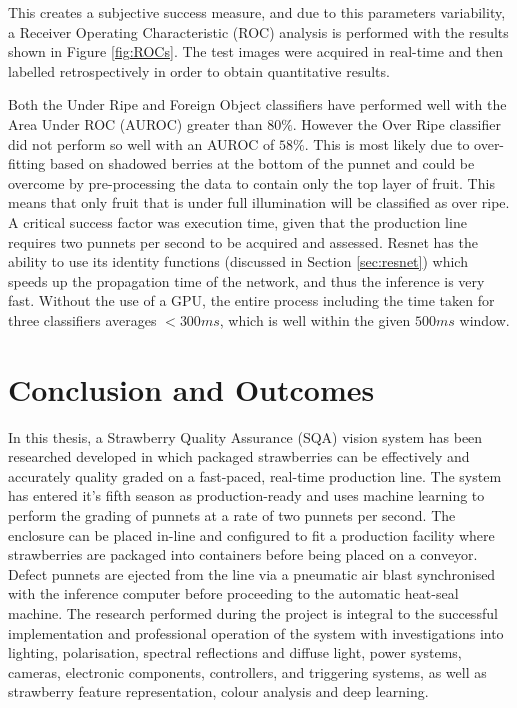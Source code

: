 \documentclass[fleqn,twoside,12pt]{report}
\begin{document}
This creates a subjective success measure, and due to this parameters variability, a Receiver Operating Characteristic (ROC) analysis  is performed with the results shown in Figure \ref{fig:ROCs}. The test images were acquired in real-time and then labelled retrospectively in order to obtain quantitative results.

Both the Under Ripe and Foreign Object classifiers have performed well with the  Area Under ROC (AUROC) greater than $80\%$. However the Over Ripe classifier did not perform so well with an AUROC of $58\%$. This is most likely due to over-fitting based on shadowed berries at the bottom of the punnet and could be overcome by pre-processing the data to contain only the top layer of fruit. This means that only fruit that is under full illumination will be classified as over ripe. A critical success factor was execution time, given that the production line requires two punnets per second to be acquired and assessed. Resnet has the ability to use its identity functions (discussed in Section \ref{sec:resnet}) which speeds up the propagation time of the network, and thus the inference is very fast. Without the use of a GPU, the entire process including the time taken for three classifiers averages $<300ms$, which is well within the given $500ms$ window.





\newpage

\chapter{Conclusion and Outcomes}


In this thesis, a Strawberry Quality Assurance (SQA) vision system has been researched developed in which packaged strawberries can be effectively and accurately quality graded on a fast-paced, real-time production line. The system has entered it's fifth season as production-ready and uses machine learning to perform the grading of punnets at a rate of two punnets per second. The enclosure can be placed in-line and configured to fit a production facility where strawberries are packaged into containers before being placed on a conveyor. Defect punnets are ejected from the line via a pneumatic air blast synchronised with the inference computer before proceeding to the automatic heat-seal machine. The research performed during the project is integral to the successful implementation and professional operation of the system with investigations into lighting, polarisation, spectral reflections and diffuse light, power systems, cameras, electronic components, controllers, and triggering systems, as well as strawberry feature representation, colour analysis and deep learning. 
\end{document}
